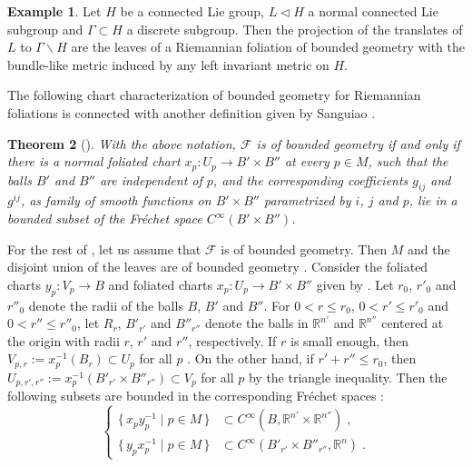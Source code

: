 \documentclass{memo-l}
\theoremstyle{plain}
\newtheorem{thm}{Theorem}[section]
\theoremstyle{definition}
\newtheorem{ex}[thm]{Example}
\theoremstyle{remark}
\newcommand{\R}{\mathbb{R}}
\newcommand{\FF}{\mathcal{F}}
\numberwithin{section}{chapter}
\numberwithin{equation}{section}%
\begin{document}
\begin{ex}\label{ex: Riem foln of bd geometry}
Let $H$ be a connected Lie group, $L\vartriangleleft H$ a normal connected Lie subgroup and $\Gamma\subset H$ a discrete subgroup. Then the projection of the translates of $L$ to $\Gamma\backslash H$ are the leaves of a Riemannian foliation of bounded geometry with the bundle-like metric induced by any left invariant metric on $H$.
\end{ex}

The following chart characterization of bounded geometry for Riemannian foliations is connected with another definition given by Sanguiao \cite[Definition~1.7]{Sanguiao2008}.

\begin{thm}[{\cite[Theorem~8.4]{AlvKordyLeichtnam2014}}]\label{t: foln of bd geometry}
  With the above notation, $\FF$ is of bounded geometry if and only if there is a normal foliated chart $x_p:U_p\to B'\times B''$ at every $p\in M$, such that the balls $B'$ and $B''$ are independent of $p$, and the corresponding coefficients $g_{ij}$ and $g^{ij}$, as family of smooth functions on $B'\times B''$ parametrized by $i$, $j$ and $p$, lie in a bounded subset of the Fr\'echet space $C^\infty(B'\times B'')$.
\end{thm}

For the rest of , let us assume that $\FF$ is of bounded geometry. Then $M$ and the disjoint union of the leaves are of bounded geometry \cite[Remark~8.2 and Proposition~8.6]{AlvKordyLeichtnam2014}. Consider the foliated charts $y_p:V_p\to B$ and foliated charts $x_p:U_p\to B'\times B''$ given by . Let $r_0$, $r'_0$ and $r''_0$ denote the radii of the balls $B$, $B'$ and $B''$. For $0<r\le r_0$, $0<r'\le r'_0$ and $0<r''\le r''_0$, let $R_r$, $B'_{r'}$ and $B''_{r''}$ denote the balls in $\R^{n'}$ and $\R^{n''}$ centered at the origin with radii $r$, $r'$ and $r''$, respectively. If $r$ is small enough, then $V_{p,r}:=x_p^{-1}(B_r)\subset U_p$ for all $p$ \cite[Proposition~8.6]{AlvKordyLeichtnam2014}. On the other hand, if $r'+r''\le r_0$, then $U_{p,r',r''}:=x_p^{-1}(B'_{r'}\times B''_{r''})\subset V_p$ for all $p$ by the triangle inequality. Then the following subsets are bounded in the corresponding Fr\'echet spaces \cite[Proposition~5.6 and~5.7]{AlvKordyLeichtnam2020}:
\begin{equation}\label{x_p y_p^-1}
\left\{
\begin{aligned}
\{\,x_py_p^{-1}\mid p\in M\,\}&\subset C^\infty(B,\R^{n'}\times\R^{n''})\;,\\
\{\,y_px_p^{-1}\mid p\in M\,\}&\subset C^\infty(B'_{r'}\times B''_{r''},\R^n)\;.
\end{aligned}
\right.
\end{equation}
\end{document}
